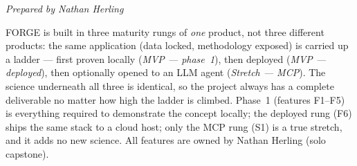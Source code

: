 \documentclass[11pt]{article}
\newcommand{\preparedby}{%
  \par\nobreak\vspace{-6pt}%
  {\footnotesize\itshape\color{forgemute}Prepared by Nathan Herling}%
  \par\vspace{4pt}}
\begin{document}
\preparedby

FORGE is built in three maturity rungs of \emph{one} product, not three different products: the same application (data locked, methodology exposed) is carried up a ladder --- first proven locally (\emph{MVP --- phase~1}), then deployed (\emph{MVP --- deployed}), then optionally opened to an LLM agent (\emph{Stretch --- MCP}). The science underneath all three is identical, so the project always has a complete deliverable no matter how high the ladder is climbed. Phase~1 (features F1--F5) is everything required to demonstrate the concept locally; the deployed rung (F6) ships the same stack to a cloud host; only the MCP rung (S1) is a true stretch, and it adds no new science. All features are owned by Nathan Herling (solo capstone).
\end{document}

